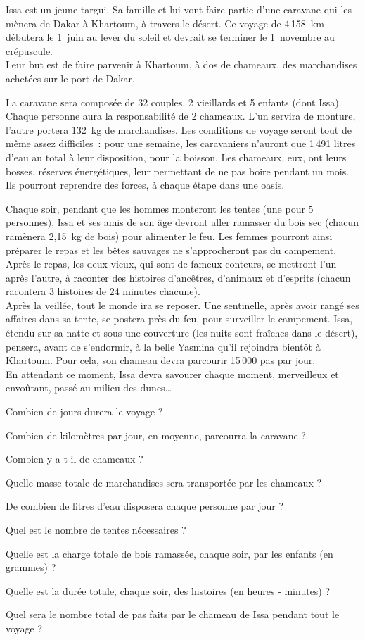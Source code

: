 Issa est un jeune targui. Sa famille et lui vont faire partie d'une caravane qui les mènera de Dakar à Khartoum, à travers le désert. Ce voyage de 4\,158~km débutera le 1\ier\ juin au lever du soleil et devrait se terminer le 1\ier\ novembre au crépuscule.
\\Leur but est de faire parvenir à Khartoum, à dos de chameaux, des marchandises achetées sur le port de Dakar.
\par La caravane sera composée de 32 couples, 2 vieillards et 5 enfants (dont Issa). Chaque personne aura la responsabilité de 2 chameaux. L'un servira de monture, l'autre portera 132~kg de marchandises. Les conditions de voyage seront tout de même assez difficiles : pour une semaine, les caravaniers n'auront que 1\,491 litres d'eau au total à leur disposition, pour la boisson. Les chameaux, eux, ont leurs bosses, réserves énergétiques, leur permettant de ne pas boire pendant un mois. Ils pourront reprendre des forces, à chaque étape dans une oasis.\par Chaque soir, pendant que les hommes monteront les tentes (une pour 5 personnes), Issa et ses amis de son âge devront aller ramasser du bois sec (chacun ramènera 2,15~kg de bois) pour alimenter le feu. Les femmes pourront ainsi préparer le repas et les bêtes sauvages ne s'approcheront pas du campement.
\\Après le repas, les deux vieux, qui sont de fameux conteurs, se mettront l'un après l'autre, à raconter des histoires d'ancêtres, d'animaux et d'esprits (chacun racontera 3 histoires de 24 minutes chacune).
\\Après la veillée, tout le monde ira se reposer. Une sentinelle, après avoir rangé ses affaires dans sa tente, se postera près du feu, pour surveiller le campement. Issa, étendu sur sa natte et sous une couverture (les nuits sont fraîches dans le désert), pensera, avant de s'endormir, à la belle Yasmina qu'il rejoindra bientôt à Khartoum. Pour cela, son chameau devra parcourir 15\,000 pas par jour.
\\En attendant ce moment, Issa devra savourer chaque moment, merveilleux et envoûtant, passé au milieu des dunes\ldots
\begin{myenumerate}
  \item Combien de jours durera le voyage ?
  \item Combien de kilomètres par jour, en moyenne, parcourra la caravane ?
  \item Combien y a-t-il de chameaux ?
  \item Quelle masse totale de marchandises sera transportée par les chameaux ?
  \item De combien de litres d'eau disposera chaque personne par jour ?
  \item Quel est le nombre de tentes nécessaires ?
  \item Quelle est la charge totale de bois ramassée, chaque soir, par les enfants (en grammes) ? 
  \item Quelle est la durée totale, chaque soir, des histoires (en heures - minutes) ?
  \item Quel sera le nombre total de pas faits par le chameau de Issa pendant tout le voyage ?
\end{myenumerate}
